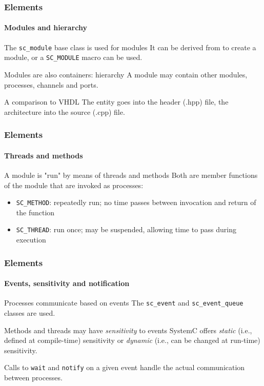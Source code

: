 \begin{frame}
\frametitle{Elements}
\framesubtitle{Modules and hierarchy}

\begin{block}{The \texttt{sc\_module} base class is used for modules}
It can be derived from to create a module, or a \texttt{SC\_MODULE} macro can be used.
\end{block}
\pause
\begin{block}{Modules are also containers: hierarchy}
A module may contain other modules, processes, channels and ports.
\end{block}
\pause
\begin{block}{A comparison to VHDL}
The entity goes into the header (.hpp) file, the architecture into the source (.cpp) file.
\end{block}

\end{frame}

\begin{frame}
\frametitle{Elements}
\framesubtitle{Threads and methods}

\begin{block}{A module is "run" by means of threads and methods}
Both are member functions of the module that are invoked as processes:
\begin{itemize}
\item \texttt{SC\_METHOD}: repeatedly run; no time passes between invocation and return of the function
\item \texttt{SC\_THREAD}: run once; may be suspended, allowing time to pass during execution
\end{itemize}
\end{block}

\end{frame}

\begin{frame}
\frametitle{Elements}
\framesubtitle{Events, sensitivity and notification}

\begin{block}{Processes communicate based on events}
The \texttt{sc\_event} and \texttt{sc\_event\_queue} classes are used.
\end{block}
\begin{block}{Methods and threads may have {\em sensitivity} to events}
SystemC offers {\em static} (i.e., defined at compile-time) sensitivity or {\em dynamic} (i.e., can be changed at run-time) sensitivity.

\medskip
Calls to \texttt{wait} and \texttt{notify} on a given event handle the actual communication between processes.
\end{block}

\end{frame}

